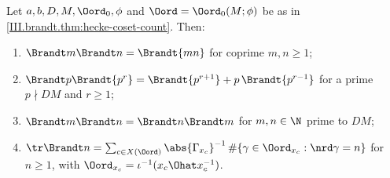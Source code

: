 Let $a,b,D,M,\Oord_0,\phi$ and $\Oord=\Oord_0(M;\phi)$ be as in \cref{III.brandt.thm:hecke-coset-count}. Then:
\begin{enumerate}[label=(\alph*)]
\item $\Brandt m\Brandt n=\Brandt{mn}$ for coprime $m,n\ge1$;
\item $\Brandt p\Brandt{p^r}=\Brandt{p^{r+1}}+p\,\Brandt{p^{r-1}}$ for a prime $p\nmid DM$ and $r\ge1$;
\item $\Brandt m\Brandt n=\Brandt n\Brandt m$ for $m,n\in\N$ prime to $DM$;
\item $\tr\Brandt n=\sum_{c\in X(\Oord)}\abs{\Gamma_{x_c}}^{-1}\,\#\{\gamma\in\Oord_{x_c}:\nrd\gamma=n\}$ for $n\ge1$, with
  $\Oord_{x_c}=\iota^{-1}(x_c\Ohat x_c^{-1})$.
\end{enumerate}
